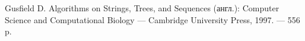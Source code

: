 \begin{thebibliography}{99}
    Gusfield D. Algorithms on Strings, Trees, and Sequences (англ.): Computer Science and Computational Biology — Cambridge University Press, 1997. — 556 p.
\end{thebibliography}
\pagebreak
